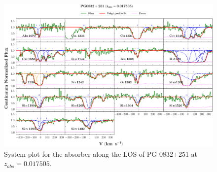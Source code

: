   
  \newpage
  
  \begin{landscape}
  
  \begin{figure}
      \centering
      \vspace{-20mm}
      \hspace*{-35mm}
      \includegraphics[width=1.25\linewidth]{System-Plots/PG0832+251_z=0.017505_sys_plot.png}
      \caption{System plot for the absorber along the LOS of PG 0832+251 at $z_{abs} = 0.017505$. }
  \end{figure}
  
  \end{landscape}
  
